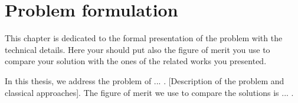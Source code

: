 \chapter{Problem formulation}
\label{ch:problem_formulation}

This chapter is dedicated to the formal presentation of the problem with the technical details. Here your should put also the figure of merit you use to compare your solution with the ones of the related works you presented.

In this thesis, we address the problem of ... . [Description of the problem and classical approaches]. The figure of merit we use to compare the solutions is ... .
